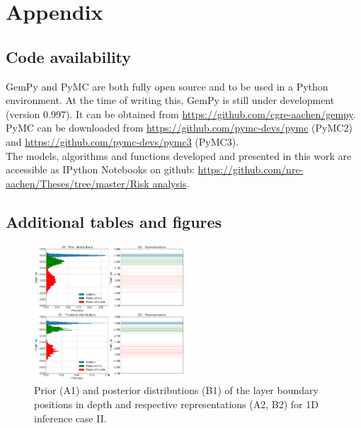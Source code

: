 \documentclass[a4paper,11pt]{MScThesis}
\begin{document}
\cleardoublepage
		
		
		
		




%
    


\appendix

    \chapter{Appendix}
    \section{Code availability}
    	GemPy and PyMC are both fully open source and to be used in a Python environment. At the time of writing this, GemPy is still under development (version 0.997). It can be obtained from \url{https://github.com/cgre-aachen/gempy}. PyMC can be downloaded from \url{https://github.com/pymc-devs/pymc} (PyMC2) and \url{https://github.com/pymc-devs/pymc3} (PyMC3).\\
    	The models, algorithms and functions developed and presented in this work are accessible as IPython Notebooks on github: \url{https://github.com/nre-aachen/Theses/tree/master/Risk analysis}.
\newpage
    \section{Additional tables and figures}
    
    \begin{figure}[h]
    	\centering
    	\includegraphics[width=0.5\textwidth]{Figures/Appendix/update_goodseal1}
    	\caption{Prior (A1) and posterior distributions (B1) of the layer boundary positions in depth and respective representations (A2, B2) for 1D inference case II.}\label{fig:update_goodseal1}
    \end{figure}
\end{document}
